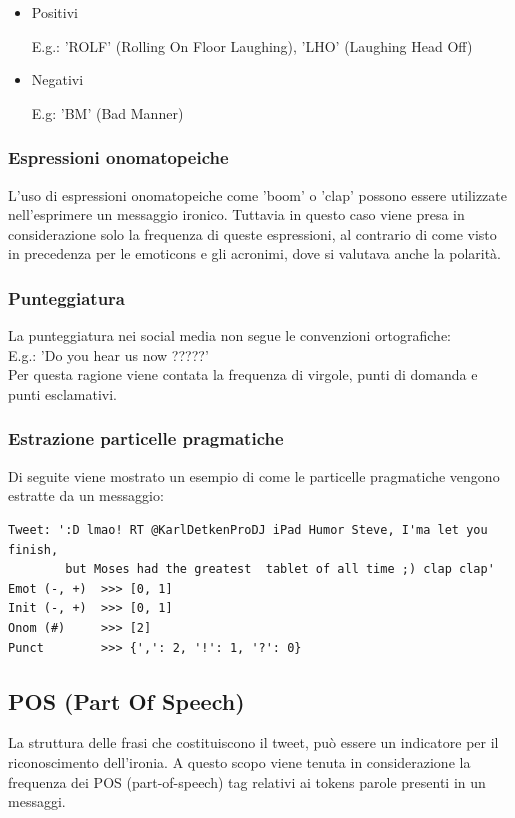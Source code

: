 \documentclass[oneside]{book}
\begin{document}
\begin{itemize}
	\item
	Positivi
	
	E.g.: 'ROLF' (Rolling On Floor Laughing), 'LHO' (Laughing Head Off)
	\item
	Negativi
	
	E.g: 'BM' (Bad Manner)
	
\end{itemize}

\subsubsection{Espressioni onomatopeiche}
L'uso di espressioni onomatopeiche come 'boom' o 'clap' possono essere utilizzate nell'esprimere un messaggio ironico. Tuttavia in questo caso viene presa in considerazione solo la frequenza di queste espressioni, al contrario di come visto in precedenza per le emoticons e gli acronimi, dove si valutava anche la polarità.

\subsubsection{Punteggiatura}
La punteggiatura nei social media non segue le convenzioni ortografiche:\\
E.g.: 'Do you hear us now ?????'\\
Per questa ragione viene contata la frequenza di virgole, punti di domanda e punti esclamativi.

\subsubsection{Estrazione particelle pragmatiche}
Di seguite viene mostrato un esempio di come le particelle pragmatiche vengono estratte da un messaggio:

\begin{lstlisting}[caption={Esempio di tweet processato per estrarre le particelle pragmatiche.}]
Tweet: ':D lmao! RT @KarlDetkenProDJ iPad Humor Steve, I'ma let you finish,
        but Moses had the greatest  tablet of all time ;) clap clap'
Emot (-, +)  >>> [0, 1]
Init (-, +)  >>> [0, 1]
Onom (#)     >>> [2]
Punct        >>> {',': 2, '!': 1, '?': 0}
\end{lstlisting}


\subsection{POS (Part Of Speech)}
La struttura delle frasi che costituiscono il tweet, può essere un indicatore per il riconoscimento dell'ironia. A questo scopo viene tenuta in considerazione la frequenza dei POS (part-of-speech) tag relativi ai tokens parole presenti in un messaggi.
\end{document}
